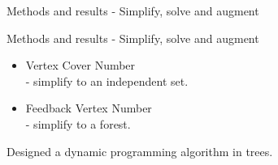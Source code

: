\documentclass{beamer}
\begin{document}
\begin{frame}{Methods and results - Simplify, solve and augment}
\end{frame}
\begin{frame}[t]{Methods and results - Simplify, solve and augment}
\vspace{.5cm}
	\begin{itemize}
		\item Vertex Cover Number\\ \hspace{.5cm} - simplify to an independent set.
		\item Feedback Vertex Number\\ \hspace{.5cm} - simplify to a forest.
	\end{itemize}
	Designed a dynamic programming algorithm in trees.
\end{frame}
\end{document}

